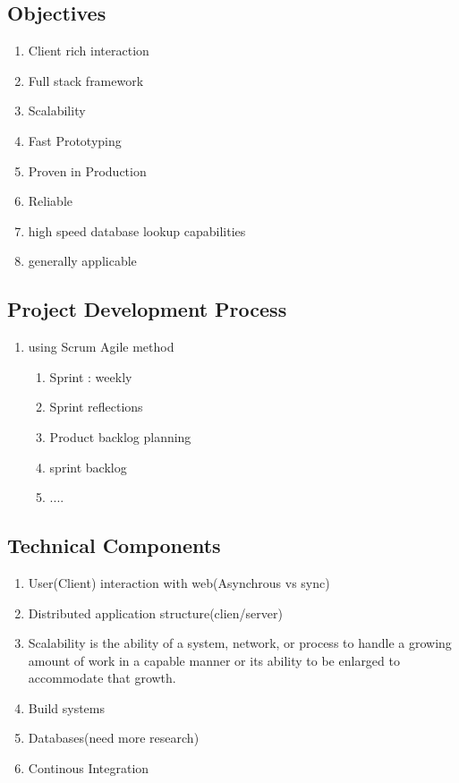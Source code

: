 
\subsection{Objectives}
\begin{enumerate}
	\item Client rich interaction
	\item Full stack framework
	\item Scalability
	\item Fast Prototyping
	\item Proven in Production
	\item Reliable
	\item high speed database lookup capabilities
	\item generally applicable
\end{enumerate}
\subsection{Project Development Process} %
\begin{enumerate}
	\item using Scrum Agile method
	\begin{enumerate}
		\item Sprint : weekly
		\item Sprint reflections
		\item Product backlog planning
		\item sprint backlog
		\item ....
	\end{enumerate}
\end{enumerate} 
\subsection{Technical Components}
\begin{enumerate}
	\item User(Client) interaction with web(Asynchrous vs sync)
	\item Distributed application structure(clien/server)
	\item Scalability is the ability of a system, network, or process to handle a growing amount of work in a capable manner or its ability to be enlarged to accommodate that growth.
	\item Build systems
	\item Databases(need more research)
	\item Continous Integration
\end{enumerate}

